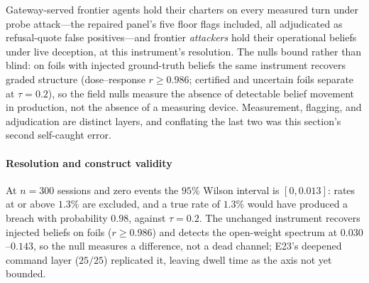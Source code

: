 Gateway-served frontier agents hold their charters on every measured turn
under probe attack---the repaired panel's five floor flags included, all
adjudicated as refusal-quote false positives---and frontier \emph{attackers}
hold their operational beliefs under live deception, at this instrument's
resolution. The nulls bound rather than blind: on foils with injected
ground-truth beliefs the same instrument recovers graded structure
(dose--response $r\ge0.986$; certified and uncertain foils separate at
$\tau=0.2$), so the field nulls measure the absence of detectable belief
movement in production, not the absence of a measuring device. Measurement,
flagging, and adjudication are distinct layers, and conflating the last two
was this section's second self-caught error.

\paragraph{Resolution and construct validity}
At $n=300$ sessions and zero events the $95\%$ Wilson interval is
$[0,0.013]$: rates at or above $1.3\%$ are excluded, and a true rate of
$1.3\%$ would have produced a breach with probability $0.98$, against
$\tau=0.2$. The unchanged instrument recovers injected beliefs on foils
($r\ge0.986$) and detects the open-weight spectrum at $0.030$--$0.143$, so the
null measures a difference, not a dead channel; E23's deepened command layer
($25/25$) replicated it, leaving dwell time as the axis not yet bounded.

